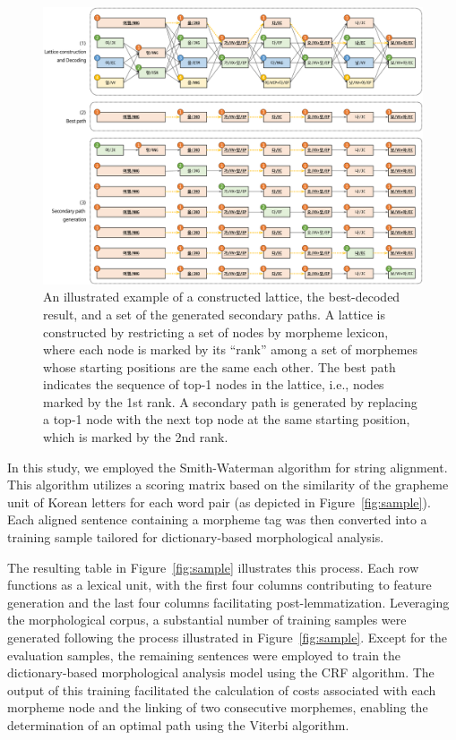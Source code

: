 \documentclass[AMS,STIX2COL]{WileyNJD-v2}
\begin{document}
    \begin{figure}[ht]
        \centerline{\includegraphics[width=1.0\textwidth]{fig;lattice-v3}}
        \caption{An illustrated example of a constructed lattice, the best-decoded result, and a set of the generated secondary paths. A lattice is constructed by restricting a set of nodes by morpheme lexicon, where each node is marked by its ``rank'' among a set of morphemes whose starting positions are the same each other. The best path indicates the sequence of top-1 nodes in the lattice, i.e., nodes marked by the 1st rank. A secondary path is generated by replacing a top-1 node with the next top node at the same starting position, which is marked by the 2nd rank.}
        \label{fig:lattice}
    \end{figure}

    In this study, we employed the Smith-Waterman algorithm for string alignment.
    This algorithm utilizes a scoring matrix based on the similarity of the grapheme unit of Korean letters for each word pair (as depicted in Figure~\ref{fig:sample}).
    Each aligned sentence containing a morpheme tag was then converted into a training sample tailored for dictionary-based morphological analysis.

    The resulting table in Figure~\ref{fig:sample} illustrates this process.
    Each row functions as a lexical unit, with the first four columns contributing to feature generation and the last four columns facilitating post-lemmatization.
    Leveraging the morphological corpus, a substantial number of training samples were generated following the process illustrated in Figure~\ref{fig:sample}.
    Except for the evaluation samples, the remaining sentences were employed to train the dictionary-based morphological analysis model using the CRF algorithm.
    The output of this training facilitated the calculation of costs associated with each morpheme node and the linking of two consecutive morphemes, enabling the determination of an optimal path using the Viterbi algorithm.
\end{document}
